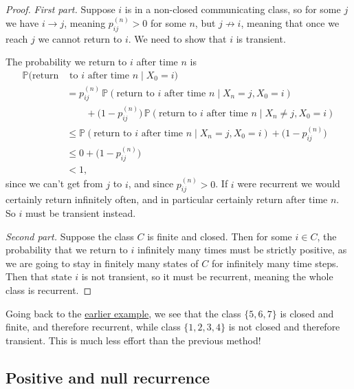 \documentclass[
  a4paper,
]{article}
\theoremstyle{definition}
\theoremstyle{definition}
\theoremstyle{definition}
\theoremstyle{remark}
\begin{document}
\begin{proof}

\emph{First part.} Suppose \(i\) is in a non-closed communicating class, so for some \(j\) we have \(i \to j\), meaning \(p_{ij}^{(n)} > 0\) for some \(n\), but \(j \not\to i\), meaning that once we reach \(j\) we cannot return to \(i\). We need to show that \(i\) is transient.

The probability we return to \(i\) after time \(n\) is
\begin{align*}
\mathbb P(\text{return} & \text{ to } i \text{ after time $n$} \mid X_0 = i) \\
&= p_{ij}^{(n)}\,\mathbb P(\text{return to $i$ after time $n$} \mid X_n = j, X_0 = i) \\
&\qquad {}+ \big(1 - p_{ij}^{(n)}\big)\,\mathbb P(\text{return to $i$ after time $n$} \mid X_n \neq j, X_0 = i) \\
&\leq \mathbb P(\text{return to $i$ after time $n$} \mid X_n = j, X_0 = i) +  \big(1 - p_{ij}^{(n)}\big) \\
&\leq 0 + \big(1 - p_{ij}^{(n)}\big) \\
&< 1,
\end{align*}
since we can't get from \(j\) to \(i\), and since \(p_{ij}^{(n)} > 0\). If \(i\) were recurrent we would certainly return infinitely often, and in particular certainly return after time \(n\). So \(i\) must be transient instead.

\emph{Second part.} Suppose the class \(C\) is finite and closed. Then for some \(i \in C\), the probability that we return to \(i\) infinitely many times must be strictly positive, as we are going to stay in finitely many states of \(C\) for infinitely many time steps. Then that state \(i\) is not transient, so it must be recurrent, meaning the whole class is recurrent.

\end{proof}

Going back to the \protect\hyperlink{exm:rec}{earlier example}, we see that the class \(\{5,6,7\}\) is closed and finite, and therefore recurrent, while class \(\{1,2,3,4\}\) is not closed and therefore transient. This is much less effort than the previous method!

\hypertarget{S09-positive-null}{%
\subsection{Positive and null recurrence}\label{S09-positive-null}}
\end{document}
